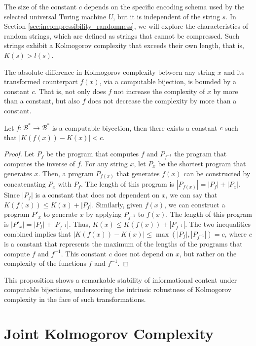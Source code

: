 The size of the constant $c$ depends on the specific encoding schema used by the selected universal Turing machine $U$, but it is independent of the string $s$. In Section \ref{sec:incompressibility_randomness}, we will explore the characteristics of random strings, which are defined as strings that cannot be compressed. Such strings exhibit a Kolmogorov complexity that exceeds their own length, that is, $K(s) > l(s)$.

The absolute difference in Kolmogorov complexity between any string \(x\) and its transformed counterpart \(f(x)\), via a computable bijection, is bounded by a constant $c$. That is, not only does $f$ not increase the complexity of $x$ by more than a constant, but also $f$ does not decrease the complexity by more than a constant.

\begin{proposition}
Let $f:\mathcal{B}^{\ast} \to \mathcal{B}^{\ast}$ is a computable biyection, then there exists a constant $c$ such that $| K\left( f(x) \right) -  K(x) | < c$.
\end{proposition}
\begin{proof}
Let $P_f$ be the program that computes $f$ and $P_{f^{-1}}$ the program that computes the inverse of $f$. For any string $x$, let $P_x$ be the shortest program that generates $x$. Then, a program $P_{f(x)}$ that generates $f(x)$ can be constructed by concatenating $P_x$ with $P_f$. The length of this program is $|P_{f(x)}| = |P_f| + |P_x|$. Since $|P_f|$ is a constant that does not dependent on $x$, we can say that $K(f(x)) \leq K(x) + |P_f|$. Similarly, given $f(x)$, we can construct a program $P'_{x}$ to generate $x$ by applying $P_{f^{-1}}$ to $f(x)$. The length of this program is $|P'_{x}| = |P_f| + |P_{f^{-1}}|$. Thus, $K(x) \leq K(f(x)) + |P_{f^{-1}}|$. The two inequalities combined implies that $|K(f(x)) - K(x)| \leq \max(|P_f|, |P_{f^{-1}}|) = c$, where \(c\) is a constant that represents the maximum of the lengths of the programs that compute \(f\) and \(f^{-1}\). This constant \(c\) does not depend on \(x\), but rather on the complexity of the functions \(f\) and \(f^{-1}\).
\end{proof}

This proposition shows a remarkable stability of informational content under computable bijections, underscoring the intrinsic robustness of Kolmogorov complexity in the face of such transformations.


%
%

\section{Joint Kolmogorov Complexity}

